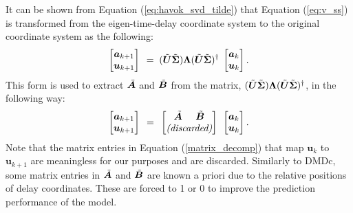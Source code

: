     It can be shown from Equation (\ref{eq:havok_svd_tilde}) that Equation (\ref{eq:v_ss}) is transformed from the eigen-time-delay coordinate system to the original coordinate system as the following:
    \begin{equation} \label{eq:v_ss_a} 
        \begin{bmatrix}
            \bm{a}_{k+1}  \\  \bm{u}_{k+1} 
        \end{bmatrix}
       \phantom{.} = \phantom{.} (\Tilde{\bm{U}} \Tilde{\bm{\Sigma}}) \bm{\Lambda} (\Tilde{\bm{U}}  \Tilde{\bm{\Sigma}})^{\dagger} \phantom{.}
        \begin{bmatrix}
            \bm{a}_{k}  \\  \bm{u}_{k} 
        \end{bmatrix} .
    \end{equation}    
    This form is used to extract $\Tilde{\bm{A}}$ and $\Tilde{\bm{B}}$ from the matrix,
    \( 
        (\Tilde{\bm{U}} \Tilde{\bm{\Sigma}}) \bm{\Lambda} (\Tilde{\bm{U}}  \Tilde{\bm{\Sigma}})^{\dagger}
    \), in the following way:
    \begin{equation} \label{matrix_decomp}
        \begin{bmatrix}
            \bm{a}_{k+1}  \\  \bm{u}_{k+1} 
        \end{bmatrix}
        \phantom{.} = \phantom{.} 
        \begin{bmatrix}
            \Tilde{\bm{A}} \phantom{.....} \Tilde{\bm{B}} \\
            \textit{(discarded)}
        \end{bmatrix}
        \phantom{.}
        \begin{bmatrix}
            \bm{a}_{k}  \\  \bm{u}_{k} 
        \end{bmatrix}.
    \end{equation}    
    Note that the matrix entries in Equation (\ref{matrix_decomp}) that map $\bm{u}_k$ to $\bm{u}_{k+1}$ are meaningless for our purposes and are discarded.
    Similarly to DMDc, some matrix entries in $\Tilde{\bm{A}}$ and $\Tilde{\bm{B}}$ are known a priori due to the relative positions of delay coordinates. These are forced to 1 or 0 to improve the prediction performance of the model.



